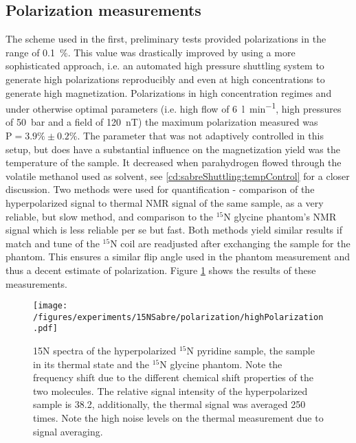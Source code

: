     \subsection{Polarization measurements}
    The scheme used in the first, preliminary tests provided polarizations in the range of \SI{0.1}{\percent}. This value was drastically improved by using a more sophisticated approach, i.e. an automated high pressure shuttling system to generate high polarizations reproducibly and even at high concentrations to generate high magnetization.
    Polarizations in high concentration regimes and under otherwise optimal parameters (i.e. high flow of \SI{6}{\litre\per\minute}, high pressures of \SI{50}{\bar} and a field of \SI{120}{\nano\tesla}) the maximum polarization measured was $\mathrm{P} = 3.9\% \pm 0.2 \%$. The parameter that was not adaptively controlled in this setup, but does have a substantial influence on the magnetization yield was the temperature of the sample.  It decreased when parahydrogen flowed through the volatile methanol used as solvent, see \ref{cd:sabreShuttling:tempControl} for a closer discussion.
    Two methods were used for quantification - comparison of the hyperpolarized signal to thermal NMR signal of the same sample, as a very reliable, but slow method, and comparison to the $^{15}$N glycine phantom's NMR signal which is less reliable per se but fast. Both methods yield similar results if match and tune of the $^{15}$N coil are readjusted after exchanging the sample for the phantom. This ensures a similar flip angle used in the phantom measurement and thus a decent estimate of polarization. Figure \ref{fig:results:15N:polarization} shows the results of these measurements.
        \begin{figure}
            \texttt{[image: /figures/experiments/15NSabre/polarization/highPolarization.pdf]}
            \caption[High $^{15}$N polarization]{15N spectra of the hyperpolarized $^{15}$N pyridine sample, the sample in its thermal state and the $^{15}$N glycine phantom. Note the frequency shift due to the different chemical shift properties of the two molecules. The relative signal intensity of the hyperpolarized sample is 38.2, additionally, the thermal signal was averaged 250 times. Note the high noise levels on the thermal measurement due to signal averaging.}
            \label{fig:results:15N:polarization}
        \end{figure}
